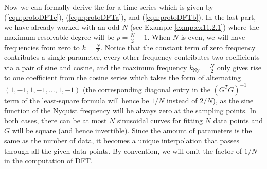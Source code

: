 Now we can formally derive the  for a time series which is given by (\ref{eqn:protoDFTc}), (\ref{eqn:protoDFTa}), and (\ref{eqn:protoDFTb}). In the last part, we have already worked with an odd $N$ (see Example \ref{exmp:ex11.2.1}) where the maximum resolvable degree will be $p = \frac{N}{2} - 1$. When $N$ is even, we will have frequencies from zero to $k = \frac{N}{2}$. Notice that the constant term of zero frequency contributes a single parameter, every other frequency contributes two coefficients via a pair of sine and cosine, and the maximum frequency $k_{\text{Ny}} = \frac{N}{2}$ only gives rise to one coefficient from the cosine series which takes the form of alternating $(1,-1,1,-1,\ldots,1,-1)$ (the corresponding diagonal entry in the $(G^TG)^{-1}$ term of the least-square formula will hence be $1/N$ instead of $2/N$), as the sine function of the Nyquist frequency will be always zero at the sampling points. In both cases, there can be at most $N$ sinusoidal curves for fitting $N$ data points and $G$ will be square (and hence invertible). Since the amount of parameters is the same as the number of data, it becomes a unique interpolation that passes through all the given data points. By convention, we will omit the factor of $1/N$ in the computation of DFT.

